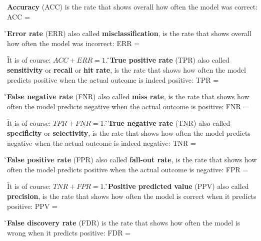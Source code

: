 \bd[Accuracy]
\textbf{Accuracy} (ACC) is the rate that shows overall how often the model was correct:
\bse
ACC = 
\ese
\ed

\v

\textbf{Error rate} (ERR) also called \textbf{misclassification}, is the rate that shows overall how often the model
was incorrect:
\bse
ERR = 
\ese
\ed

\v

It is of course: $ACC + ERR = 1$. \v

\textbf{True positive rate} (TPR) also called \textbf{sensitivity} or
\textbf{recall} or \textbf{hit rate}, is the rate that shows how often the model predicts positive when the actual
outcome is indeed positive:
\bse
TPR = 
\ese
\ed

\v

\textbf{False negative rate} (FNR) also called \textbf{miss rate}, is the rate that shows how often the model
predicts negative when the actual outcome is positive:
\bse
FNR = 
\ese
\ed

\v

It is of course: $TPR + FNR = 1$. \v

\textbf{True negative rate} (TNR) also called \textbf{specificity} or \textbf{selectivity}, is the rate that shows how
often the model predicts negative when the actual outcome is indeed negative:
\bse
TNR = 
\ese
\ed

\v

\textbf{False positive rate} (FPR) also called \textbf{fall-out rate}, is the rate that shows how often the model
predicts positive when the actual outcome is negative:
\bse
FPR = 
\ese
\ed

\v

It is of course: $TNR + FPR = 1$. \v

\textbf{Positive predicted value} (PPV) also called \textbf{precision}, is the rate that shows how often the model is
correct when it predicts positive:
\bse
PPV = 
\ese
\ed

\v

\textbf{False discovery rate} (FDR) is the rate that shows how often the model is wrong when it predicts positive:
\bse
FDR = 
\ese
\ed

